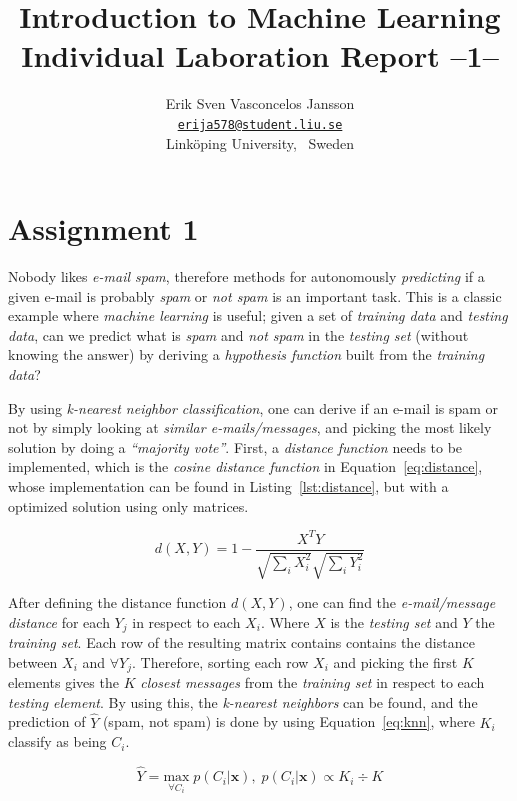 \documentclass[a4paper, twocolumn]{article}
\title{Introduction to Machine Learning \\
       Individual Laboration Report --1--}
\author{{Erik Sven Vasconcelos Jansson} \\
        {\href{mailto:erija578@student.liu.se}
        {\texttt{erija578@student.liu.se}}} \\
        {Linköping University, \, Sweden}}
\begin{document}
    \maketitle %

    \section*{Assignment 1}

    Nobody likes \emph{e-mail spam}, therefore methods for autonomously \emph{predicting} if a given e-mail is probably \emph{spam} or \emph{not spam} is an important task. This is a classic example where \emph{machine learning} is useful; given a set of \emph{training data} and \emph{testing data}, can we predict what is \emph{spam} and \emph{not spam} in the \emph{testing set} (without knowing the answer) by deriving a \emph{hypothesis function} built from the \emph{training data}?

    By using \emph{k-nearest neighbor classification}, one can derive if an e-mail is spam or not by simply looking at \emph{similar e-mails/messages}, and picking the most likely solution by doing a \emph{``majority vote''}. First, a \emph{distance function} needs to be implemented, which is the \emph{cosine distance function} in Equation~\ref{eq:distance}, whose implementation can be found in Listing~\ref{lst:distance}, but with a optimized solution using only matrices.

    \begin{equation} \label{eq:distance}
        d(X,Y) = 1 - \frac{X^TY}{\sqrt{\sum_i{X_i^2}}\sqrt{\sum_i{Y_i^2}}}
    \end{equation}

    After defining the distance function $d(X,Y)$, one can find the \emph{e-mail/message distance} for each $Y_j$ in respect to each $X_i$. Where $X$ is the \emph{testing set} and $Y$ the \emph{training set}. Each row of the resulting matrix contains contains the distance between $X_i$ and $\forall Y_j$. Therefore, sorting each row $X_i$ and picking the first $K$ elements gives the $K$ \emph{closest messages} from the \emph{training set} in respect to each \emph{testing element}. By using this, the \emph{k-nearest neighbors} can be found, and the prediction of $\hat{Y}$ (spam, not spam) is done by using Equation~\ref{eq:knn}, where $K_i$ classify as being $C_i$.

    \begin{equation} \label{eq:knn}
        \hat{Y} = \underset{\forall C_i}{\mathrm{max}}\; p(C_i | \bm{x}),\; p(C_i | \bm{x}) \propto K_i \div K
    \end{equation}
\end{document}
